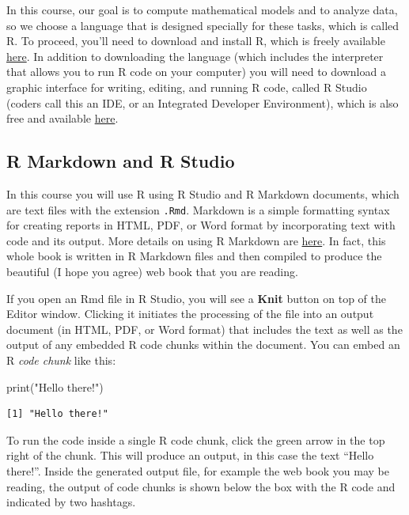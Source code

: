 \documentclass[
  letterpaper,
  DIV=11,
  numbers=noendperiod]{scrreprt}
\newenvironment{Shaded}{\begin{snugshade}}{\end{snugshade}}
\newcommand{\FunctionTok}[1]{\textcolor[rgb]{0.28,0.35,0.67}{#1}}
\newcommand{\NormalTok}[1]{\textcolor[rgb]{0.00,0.23,0.31}{#1}}
\newcommand{\StringTok}[1]{\textcolor[rgb]{0.13,0.47,0.30}{#1}}
\begin{document}
In this course, our goal is to compute mathematical models and to
analyze data, so we choose a language that is designed specially for
these tasks, which is called R. To proceed, you'll need to download and
install R, which is freely available \href{cran.r-project.org/}{here}.
In addition to downloading the language (which includes the interpreter
that allows you to run R code on your computer) you will need to
download a graphic interface for writing, editing, and running R code,
called R Studio (coders call this an IDE, or an Integrated Developer
Environment), which is also free and available
\href{www.rstudio.com/products/rstudio/download/}{here}.

\hypertarget{r-markdown-and-r-studio}{%
\subsection{R Markdown and R Studio}\label{r-markdown-and-r-studio}}

In this course you will use R using R Studio and R Markdown documents,
which are text files with the extension \texttt{.Rmd}. Markdown is a
simple formatting syntax for creating reports in HTML, PDF, or Word
format by incorporating text with code and its output. More details on
using R Markdown are \href{rmarkdown.rstudio.com}{here}. In fact, this
whole book is written in R Markdown files and then compiled to produce
the beautiful (I hope you agree) web book that you are reading.

If you open an Rmd file in R Studio, you will see a \textbf{Knit} button
on top of the Editor window. Clicking it initiates the processing of the
file into an output document (in HTML, PDF, or Word format) that
includes the text as well as the output of any embedded R code chunks
within the document. You can embed an R \emph{code chunk} like this:

\begin{Shaded}
\begin{Highlighting}[]
\FunctionTok{print}\NormalTok{(}\StringTok{"Hello there!"}\NormalTok{) }
\end{Highlighting}
\end{Shaded}

\begin{verbatim}
[1] "Hello there!"
\end{verbatim}

To run the code inside a single R code chunk, click the green arrow in
the top right of the chunk. This will produce an output, in this case
the text ``Hello there!''. Inside the generated output file, for example
the web book you may be reading, the output of code chunks is shown
below the box with the R code and indicated by two hashtags.
\end{document}
